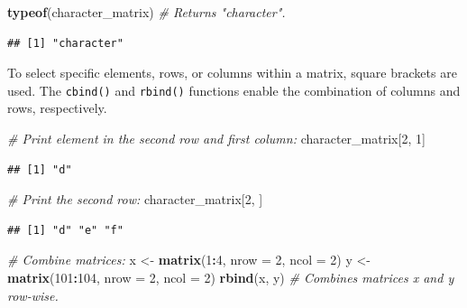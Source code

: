 \documentclass[
]{book}
\newenvironment{Shaded}{\begin{snugshade}}{\end{snugshade}}
\newcommand{\AttributeTok}[1]{\textcolor[rgb]{0.13,0.29,0.53}{#1}}
\newcommand{\CommentTok}[1]{\textcolor[rgb]{0.56,0.35,0.01}{\textit{#1}}}
\newcommand{\DecValTok}[1]{\textcolor[rgb]{0.00,0.00,0.81}{#1}}
\newcommand{\FunctionTok}[1]{\textcolor[rgb]{0.13,0.29,0.53}{\textbf{#1}}}
\newcommand{\NormalTok}[1]{#1}
\newcommand{\OtherTok}[1]{\textcolor[rgb]{0.56,0.35,0.01}{#1}}
\newcommand{\SpecialCharTok}[1]{\textcolor[rgb]{0.81,0.36,0.00}{\textbf{#1}}}
\begin{document}
\begin{Shaded}
\begin{Highlighting}[]
\FunctionTok{typeof}\NormalTok{(character\_matrix)  }\CommentTok{\# Returns "character".}
\end{Highlighting}
\end{Shaded}

\begin{verbatim}
## [1] "character"
\end{verbatim}

To select specific elements, rows, or columns within a matrix, square brackets are used. The \texttt{cbind()} and \texttt{rbind()} functions enable the combination of columns and rows, respectively.

\begin{Shaded}
\begin{Highlighting}[]
\CommentTok{\# Print element in the second row and first column:}
\NormalTok{character\_matrix[}\DecValTok{2}\NormalTok{, }\DecValTok{1}\NormalTok{]}
\end{Highlighting}
\end{Shaded}

\begin{verbatim}
## [1] "d"
\end{verbatim}

\begin{Shaded}
\begin{Highlighting}[]
\CommentTok{\# Print the second row:}
\NormalTok{character\_matrix[}\DecValTok{2}\NormalTok{, ]}
\end{Highlighting}
\end{Shaded}

\begin{verbatim}
## [1] "d" "e" "f"
\end{verbatim}

\begin{Shaded}
\begin{Highlighting}[]
\CommentTok{\# Combine matrices:}
\NormalTok{x }\OtherTok{\textless{}{-}} \FunctionTok{matrix}\NormalTok{(}\DecValTok{1}\SpecialCharTok{:}\DecValTok{4}\NormalTok{, }\AttributeTok{nrow =} \DecValTok{2}\NormalTok{, }\AttributeTok{ncol =} \DecValTok{2}\NormalTok{)}
\NormalTok{y }\OtherTok{\textless{}{-}} \FunctionTok{matrix}\NormalTok{(}\DecValTok{101}\SpecialCharTok{:}\DecValTok{104}\NormalTok{, }\AttributeTok{nrow =} \DecValTok{2}\NormalTok{, }\AttributeTok{ncol =} \DecValTok{2}\NormalTok{)}
\FunctionTok{rbind}\NormalTok{(x, y)  }\CommentTok{\# Combines matrices x and y row{-}wise.}
\end{Highlighting}
\end{Shaded}
\end{document}
